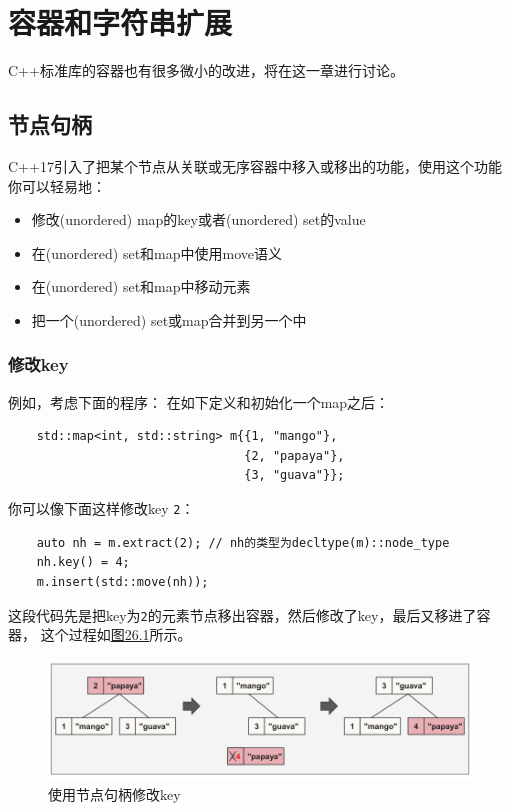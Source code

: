 \chapter{容器和字符串扩展}\label{ch26}
C++标准库的容器也有很多微小的改进，将在这一章进行讨论。


\section{节点句柄}
C++17引入了把某个节点从关联或无序容器中移入或移出的功能，使用这个功能你可以轻易地：
\begin{itemize}
    \item 修改(unordered) map的key或者(unordered) set的value
    \item 在(unordered) set和map中使用move语义
    \item 在(unordered) set和map中移动元素
    \item 把一个(unordered) set或map合并到另一个中
\end{itemize}

\subsection{修改key}
例如，考虑下面的程序：
在如下定义和初始化一个map之后：
\begin{lstlisting}
    std::map<int, std::string> m{{1, "mango"},
                                 {2, "papaya"},
                                 {3, "guava"}};
\end{lstlisting}
你可以像下面这样修改key \texttt{2}：
\begin{lstlisting}
    auto nh = m.extract(2); // nh的类型为decltype(m)::node_type
    nh.key() = 4;
    m.insert(std::move(nh));
\end{lstlisting}
这段代码先是把key为\texttt{2}的元素节点移出容器，然后修改了key，最后又移进了容器，
这个过程如\hyperref[f26.1]{图26.1}所示。
\begin{figure}[htb]
    \centering
    \includegraphics[scale=0.67]{../imgs/26.1.png}
    \caption{使用节点句柄修改key}
    \label{f26.1}
\end{figure}

